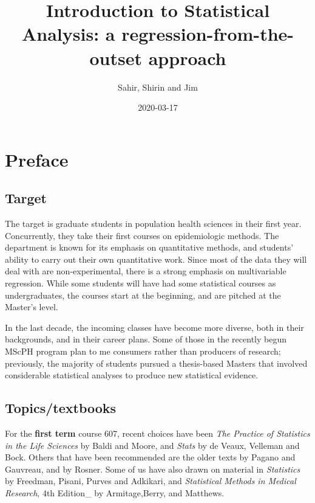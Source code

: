 \documentclass[]{book}
\title{Introduction to Statistical Analysis: a regression-from-the-outset approach}
\author{Sahir, Shirin and Jim}
\date{2020-03-17}
\begin{document}
\maketitle

{
\setcounter{tocdepth}{1}
\tableofcontents
}
\hypertarget{preface}{%
\chapter*{Preface}\label{preface}}

\hypertarget{target}{%
\section{Target}\label{target}}

The target is graduate students in population health sciences in their first year. Concurrently, they take their first courses on epidemiologic methods. The department is known for its emphasis on quantitative methods, and students' ability to carry out their own quantitative work. Since most of the data they will deal with are non-experimental, there is a strong emphasis on multivariable regression. While some students will have had some statistical courses as undergraduates, the courses start at the beginning, and are pitched at the Master's level.

In the last decade, the incoming classes have become more diverse, both in their backgrounds, and in their career plans. Some of those in the recently begun MScPH program plan to me consumers rather than producers of research; previously, the majority of students pursued a thesis-based Masters that involved considerable statistical analyses to produce new statistical evidence.

\hypertarget{topicstextbooks}{%
\section{Topics/textbooks}\label{topicstextbooks}}

For the \textbf{first term} course 607, recent choices have been \emph{The Practice of Statistics in the Life Sciences} by Baldi and Moore, and \emph{Stats} by de Veaux, Velleman and Bock. Others that have been recommended are the older texts by Pagano and Gauvreau, and by Rosner. Some of us have also drawn on material in \emph{Statistics} by Freedman, Pisani, Purves and Adkikari, and
\emph{Statistical Methods in Medical Research}, 4th Edition\_ by
Armitage,Berry, and Matthews.
\end{document}

